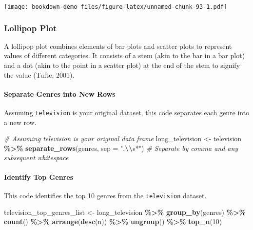 \documentclass[
  b5paper]{book}
\newenvironment{Shaded}{\begin{snugshade}}{\end{snugshade}}
\newcommand{\AttributeTok}[1]{\textcolor[rgb]{0.13,0.29,0.53}{#1}}
\newcommand{\CommentTok}[1]{\textcolor[rgb]{0.56,0.35,0.01}{\textit{#1}}}
\newcommand{\DecValTok}[1]{\textcolor[rgb]{0.00,0.00,0.81}{#1}}
\newcommand{\FunctionTok}[1]{\textcolor[rgb]{0.13,0.29,0.53}{\textbf{#1}}}
\newcommand{\NormalTok}[1]{#1}
\newcommand{\OtherTok}[1]{\textcolor[rgb]{0.56,0.35,0.01}{#1}}
\newcommand{\SpecialCharTok}[1]{\textcolor[rgb]{0.81,0.36,0.00}{\textbf{#1}}}
\newcommand{\StringTok}[1]{\textcolor[rgb]{0.31,0.60,0.02}{#1}}
\begin{document}
\texttt{[image: bookdown-demo\_files/figure-latex/unnamed-chunk-93-1.pdf]}

\hypertarget{lollipop-plot}{%
\subsubsection*{Lollipop Plot}\label{lollipop-plot}}

A lollipop plot combines elements of bar plots and scatter plots to represent values of different categories. It consists of a stem (akin to the bar in a bar plot) and a dot (akin to the point in a scatter plot) at the end of the stem to signify the value (Tufte, 2001).

\hypertarget{separate-genres-into-new-rows}{%
\paragraph*{Separate Genres into New Rows}\label{separate-genres-into-new-rows}}

Assuming \texttt{television} is your original dataset, this code separates each genre into a new row.

\begin{Shaded}
\begin{Highlighting}[]
\CommentTok{\# Assuming \textasciigrave{}television\textasciigrave{} is your original data frame}
\NormalTok{long\_television }\OtherTok{\textless{}{-}}\NormalTok{ television }\SpecialCharTok{\%\textgreater{}\%}
  \FunctionTok{separate\_rows}\NormalTok{(genres, }\AttributeTok{sep =} \StringTok{",}\SpecialCharTok{\textbackslash{}\textbackslash{}}\StringTok{s*"}\NormalTok{)  }\CommentTok{\# Separate by comma and any subsequent whitespace}
\end{Highlighting}
\end{Shaded}

\hypertarget{identify-top-genres}{%
\paragraph*{Identify Top Genres}\label{identify-top-genres}}

This code identifies the top 10 genres from the \texttt{television} dataset.

\begin{Shaded}
\begin{Highlighting}[]
\NormalTok{television\_top\_genres\_list }\OtherTok{\textless{}{-}}\NormalTok{ long\_television }\SpecialCharTok{\%\textgreater{}\%}
  \FunctionTok{group\_by}\NormalTok{(genres) }\SpecialCharTok{\%\textgreater{}\%}
  \FunctionTok{count}\NormalTok{() }\SpecialCharTok{\%\textgreater{}\%}
  \FunctionTok{arrange}\NormalTok{(}\FunctionTok{desc}\NormalTok{(n)) }\SpecialCharTok{\%\textgreater{}\%}
  \FunctionTok{ungroup}\NormalTok{() }\SpecialCharTok{\%\textgreater{}\%}
  \FunctionTok{top\_n}\NormalTok{(}\DecValTok{10}\NormalTok{)}
\end{Highlighting}
\end{Shaded}
\end{document}
